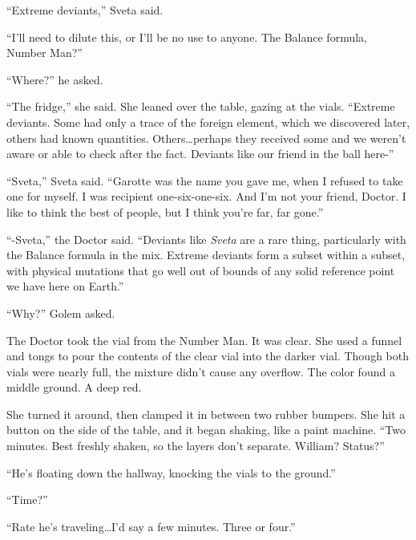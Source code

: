 ``Extreme deviants,'' Sveta said.



``I'll need to dilute this, or I'll be no use to anyone.  The Balance formula, Number Man?''



``Where?'' he asked.



``The fridge,'' she said.  She leaned over the table, gazing at the vials.  ``Extreme deviants.  Some had only a trace of the foreign element, which we discovered later, others had known quantities.  Others\ldots perhaps they received some and we weren't aware or able to check after the fact.  Deviants like our friend in the ball here-''



``Sveta,'' Sveta said.  ``Garotte was the name you gave me, when I refused to take one for myself.  I was recipient one-six-one-six.  And I'm not your friend, Doctor.  I like to think the best of people, but I think you're far, far gone.''



``-Sveta,'' the Doctor said.  ``Deviants like \emph{Sveta} are a rare thing, particularly with the Balance formula in the mix.  Extreme deviants form a subset within a subset, with physical mutations that go well out of bounds of any solid reference point we have here on Earth.''



``Why?''  Golem asked.



The Doctor took the vial from the Number Man.  It was clear.  She used a funnel and tongs to pour the contents of the clear vial into the darker vial.  Though both vials were nearly full, the mixture didn't cause any overflow.  The color found a middle ground.  A deep red.



She turned it around, then clamped it in between two rubber bumpers.  She hit a button on the side of the table, and it began shaking, like a paint machine.  ``Two minutes.  Best freshly shaken, so the layers don't separate.  William?  Status?''



``He's floating down the hallway, knocking the vials to the ground.''



``Time?''



``Rate he's traveling\ldots I'd say a few minutes.  Three or four.''



